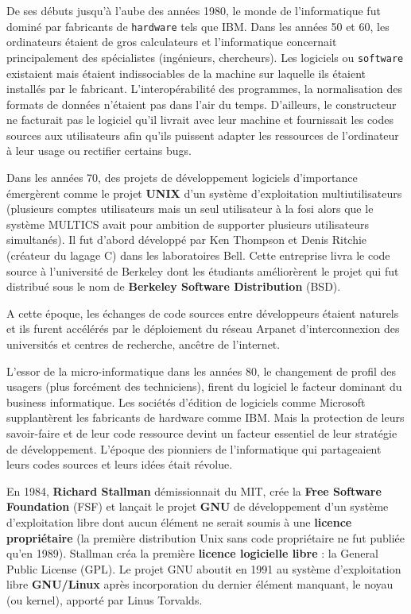 \documentclass[
  11pt,
]{article}
\newcounter{prop}
\newcounter{prog}
\newcounter{logi}
\begin{document}
De ses débuts jusqu'à l'aube des années 1980, le monde de l'informatique
fut dominé par fabricants de \texttt{hardware} tels que IBM. Dans les
années 50 et 60, les ordinateurs étaient de gros calculateurs et
l'informatique concernait principalement des spécialistes (ingénieurs,
chercheurs). Les logiciels ou \texttt{software} existaient mais étaient
indissociables de la machine sur laquelle ils étaient installés par le
fabricant. L'interopérabilité des programmes, la normalisation des
formats de données n'étaient pas dans l'air du temps. D'ailleurs, le
constructeur ne facturait pas le logiciel qu'il livrait avec leur
machine et fournissait les codes sources aux utilisateurs afin qu'ils
puissent adapter les ressources de l'ordinateur à leur usage ou
rectifier certains bugs.

Dans les années 70, des projets de développement logiciels d'importance
émergèrent comme le projet \textbf{UNIX} d'un système d'exploitation
multiutilisateurs (plusieurs comptes utilisateurs mais un seul
utilisateur à la fosi alors que le système MULTICS avait pour ambition
de supporter plusieurs utilisateurs simultanés). Il fut d'abord
développé par Ken Thompson et Denis Ritchie (créateur du lagage C) dans
les laboratoires Bell. Cette entreprise livra le code source à
l'université de Berkeley dont les étudiants améliorèrent le projet qui
fut distribué sous le nom de \textbf{Berkeley Software Distribution}
(BSD).

A cette époque, les échanges de code sources entre développeurs étaient
naturels et ils furent accélérés par le déploiement du réseau Arpanet
d'interconnexion des universités et centres de recherche, ancêtre de
l'internet.

L'essor de la micro-informatique dans les années 80, le changement de
profil des usagers (plus forcément des techniciens), firent du logiciel
le facteur dominant du business informatique. Les sociétés d'édition de
logiciels comme Microsoft supplantèrent les fabricants de hardware comme
IBM. Mais la protection de leurs savoir-faire et de leur code ressource
devint un facteur essentiel de leur stratégie de développement. L'époque
des pionniers de l'informatique qui partageaient leurs codes sources et
leurs idées était révolue.

En 1984, \textbf{Richard Stallman} démissionnait du MIT, crée la
\textbf{Free Software Foundation} (FSF) et lançait le projet
\textbf{GNU} de développement d'un système d'exploitation libre dont
aucun élément ne serait soumis à une \textbf{licence propriétaire} (la
première distribution Unix sans code propriétaire ne fut publiée qu'en
1989). Stallman créa la première \textbf{licence logicielle libre} : la
General Public License (GPL). Le projet GNU aboutit en 1991 au système
d'exploitation libre \textbf{GNU/Linux} après incorporation du dernier
élément manquant, le noyau (ou kernel), apporté par Linus Torvalds.
\end{document}

